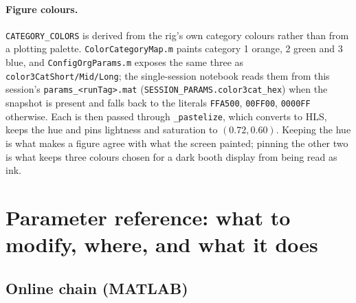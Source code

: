 \documentclass[11pt,a4paper]{article}
\newcommand{\code}[1]{\texttt{\small #1}}
\begin{document}
\paragraph{Figure colours.} \code{CATEGORY\_COLORS} is derived from the rig's
own category colours rather than from a plotting palette. \code{ColorCategoryMap.m}
paints category 1 orange, 2 green and 3 blue, and \code{ConfigOrgParams.m}
exposes the same three as \code{color3CatShort/Mid/Long}; the single-session
notebook reads them from this session's \code{params\_<runTag>.mat}
(\code{SESSION\_PARAMS.color3cat\_hex}) when the snapshot is present and falls
back to the literals \code{FFA500}, \code{00FF00}, \code{0000FF} otherwise. Each
is then passed through \code{\_pastelize}, which converts to HLS, keeps the hue
and pins lightness and saturation to $(0.72, 0.60)$. Keeping the hue is what
makes a figure agree with what the screen painted; pinning the other two is what
keeps three colours chosen for a dark booth display from being read as ink.

\section{Parameter reference: what to modify, where, and what it does}
\label{sec:params}

\subsection{Online chain (MATLAB)}
\label{sec:params-online}
\end{document}
